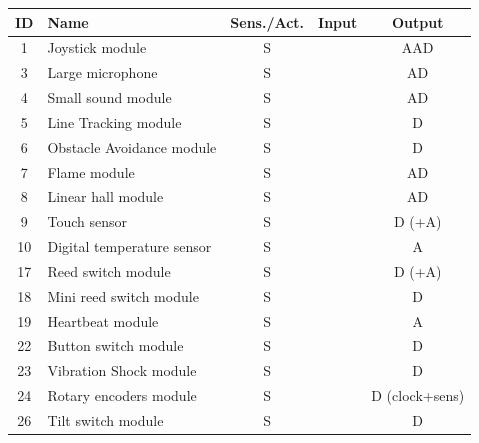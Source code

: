 \documentclass[10pt,a4paper,onecolumn]{article}
\begin{document}
\begin{table}[h!]
  \centering
  \begin{tabular}{clccc}
      \hline
      \textbf{ID} & \textbf{Name} & \textbf{Sens./Act.} & \textbf{Input} & \textbf{Output} \\
      \hline
      \rowcolor{gray!20} 1   & Joystick module               & S                 &                & AAD             \\
      3   & Large microphone              & S                 &                & AD              \\
      \rowcolor{gray!20} 4   & Small sound module            & S                 &                & AD              \\
      5   & Line Tracking module          & S                 &                & D               \\
      \rowcolor{gray!20} 6   & Obstacle Avoidance module     & S                 &                & D               \\
      7   & Flame module                  & S                 &                & AD              \\
      \rowcolor{gray!20} 8   & Linear hall module            & S                 &                & AD              \\
      9   & Touch sensor                  & S                 &                & D (+A)          \\
      \rowcolor{gray!20} 10  & Digital temperature sensor    & S                 &                & A               \\
      17  & Reed switch module            & S                 &                & D (+A)          \\
      \rowcolor{gray!20} 18  & Mini reed switch module       & S                 &                & D               \\
      19  & Heartbeat module              & S                 &                & A               \\
      \rowcolor{gray!20} 22  & Button switch module          & S                 &                & D               \\
      23  & Vibration Shock module        & S                 &                & D               \\
      \rowcolor{gray!20} 24  & Rotary encoders module        & S                 &                & D (clock+sens)  \\
      26  & Tilt switch module            & S                 &                & D               \\

\end{tabular}
\end{table}
\end{document}
